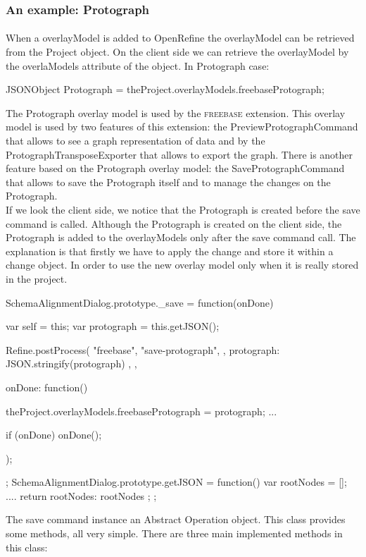 \subsubsection{An example: Protograph}
\paragraph{} When a overlayModel is added to OpenRefine the overlayModel can be retrieved from the Project object. On the client side we can retrieve the overlayModel by the overlaModels attribute of the  object. In Protograph case: 
\begin{code}
JSONObject Protograph = 
   theProject.overlayModels.freebaseProtograph;
\end{code}
The Protograph overlay model is used by the \textsc{freebase} extension. This overlay model is used by two features of this extension: the PreviewProtographCommand that allows to see a graph representation of data and by the ProtographTransposeExporter that allows to export the graph. There is another feature based on the Protograph overlay model: the SaveProtographCommand that allows to save the Protograph itself and to manage the changes on the Protograph. \\
If we look the client side, we notice that the Protograph is created before the save command is called. Although the Protograph is created on the client side, the Protograph is added to the overlayModels only after the save command call. The explanation is that firstly we have to apply the change and store it within a change object. In order to use the new overlay model only when it is really stored in the project. 
\begin{code}
SchemaAlignmentDialog.prototype._save = function(onDone) {
  var self = this;
  var protograph = this.getJSON();

  Refine.postProcess(
    "freebase",
    "save-protograph",
    {},
    { protograph: JSON.stringify(protograph) },
    {},
    {
      onDone: function() {
        theProject.overlayModels.freebaseProtograph
                              = protograph;
        ...

        if (onDone) onDone();
      }
    }
  );
};
SchemaAlignmentDialog.prototype.getJSON = 
  function() {
     var rootNodes = [];
     ....
     return {
        rootNodes: rootNodes
     };
};
\end{code}
The save command instance an Abstract Operation object. This class provides some methods, all very simple. There are three main implemented methods in this class:
